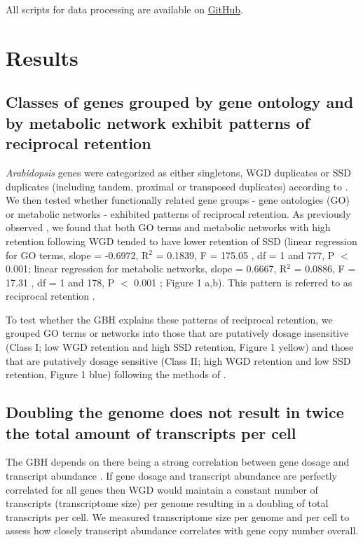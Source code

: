 \documentclass[11pt]{article}
\begin{document}
All scripts for data processing are available on \href{https://github.com/barneypotter24/ploidy-seq}{GitHub}.

\section*{Results}
\subsection*{Classes of genes grouped by gene ontology and by metabolic network exhibit patterns of reciprocal retention}

{\it Arabidopsis} genes were categorized as either singletons, WGD duplicates or SSD duplicates (including tandem, proximal or transposed duplicates) according to \cite{wang2013}. We then tested whether functionally related gene groups - gene ontologies (GO) or metabolic networks \citep{schlapfer2017}- exhibited patterns of reciprocal retention. As previously observed \citep{freeling2009, coate2016, tasdighian2017}, we found that both GO terms and metabolic networks with high retention following WGD tended to have lower retention of SSD (linear regression for GO terms, slope = -0.6972, R$^2$ = 0.1839, F = 175.05 , df = 1 and 777, P $<$ 0.001;  linear  regression  for  metabolic  networks, slope = 0.6667, R$^2$ = 0.0886, F = 17.31 , df = 1 and 178, P $<$ 0.001 ; Figure 1 a,b). This pattern is referred to as reciprocal retention \citep{cannon2004, freeling2009}.

To test whether the GBH explains these patterns of reciprocal retention, we grouped GO terms or networks into those that are putatively dosage insensitive (Class I; low WGD retention and high SSD retention, Figure 1 yellow) and those that are putatively dosage sensitive (Class II; high WGD retention and low SSD retention, Figure 1 blue) following the methods of \cite{coate2016}. 

\subsection*{Doubling the genome does not result in twice the total amount of transcripts per cell}

The GBH depends on there being a strong correlation between gene dosage and transcript abundance \citep{coate2016}. If gene dosage and transcript abundance are perfectly correlated for all genes then WGD would maintain a constant number of transcripts (transcriptome size) per genome resulting in a doubling of total transcripts per cell. We measured transcriptome size per genome and per cell to assess how closely transcript abundance correlates with gene copy number overall. 
\end{document}
